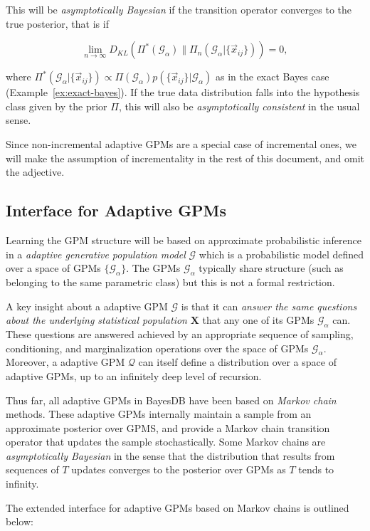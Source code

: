 \documentclass[10pt,letterpaper]{article}
\newcommand{\set}[1]{\{#1\}}
\newcommand{\G}{\mathcal{G}}
\begin{document}
This will be \emph{asymptotically Bayesian} if the transition operator
converges to the true posterior, that is if

\[ \lim_{n\to\infty}D_{KL}(\Pi^*(\G_\alpha) \| \Pi_n(\G_\alpha|\{\vec{x}_{ij}\})) = 0, \]

where $\Pi^*(\G_\alpha|\{\vec{x}_{ij}\}) \propto \Pi(\G_\alpha) p(\{\vec{x}_{ij}\}|\G_\alpha)$
as in the exact Bayes case (Example~\ref{ex:exact-bayes}).
If the true data distribution falls into the hypothesis class given by
the prior $\Pi$, this will also be \emph{asymptotically consistent} in
the usual sense.

Since non-incremental adaptive GPMs are a special case of incremental
ones, we will make the assumption of incrementality in the rest of
this document, and omit the adjective.

\subsection{Interface for Adaptive GPMs}
\label{sec:adaptive_gpm}

Learning the GPM structure will be
based on approximate probabilistic inference in a \textit{adaptive generative
population model} $\G$ which is a probabilistic model defined over a
space of GPMs $\set{\mathcal{G_\alpha}}$. The GPMs $\G_\alpha$
typically share structure (such as belonging to the same parametric class) but
this is not a formal restriction.

A key insight about a adaptive GPM $\G$ is that it can \textit{answer
the same questions about the underlying statistical population} $\mathbf{X}$
that any one of its GPMs $\G_\alpha$ can. These questions are answered
achieved by an appropriate sequence of sampling, conditioning, and
marginalization operations over the space of GPMs $\G_\alpha$.
Moreover, a adaptive GPM $\mathcal{Q}$ can itself define a distribution over a
space of adaptive GPMs, up to an infinitely deep level of recursion.

Thus far, all adaptive GPMs in BayesDB have been based on \textit{Markov chain}
methods. These adaptive GPMs internally maintain a sample from an approximate
posterior over GPMS, and provide a Markov chain transition operator that updates
the sample stochastically. Some Markov chains are \textit{asymptotically
Bayesian} in the sense that the distribution that results from sequences of $T$
updates converges to the posterior over GPMs as $T$ tends to infinity.

The extended interface for adaptive GPMs based on Markov chains is outlined
below:
\end{document}
